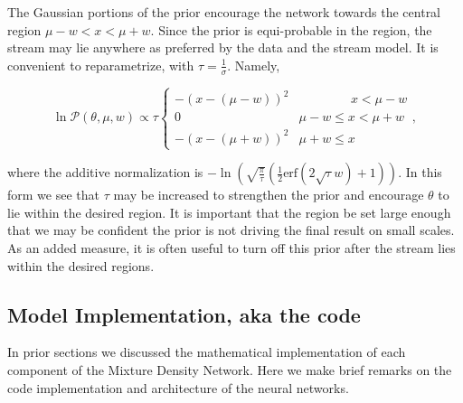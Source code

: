 \documentclass[twocolumn]{aastex631}
\newcommand{\mcal}[1]{\mathcal{#1}}
\newcommand{\pdf}{\mcal{P}}
\begin{document}
            The Gaussian portions of the prior encourage the network towards the central region $\mu - w < x < \mu + w$. Since the prior is equi-probable in the region, the stream may lie anywhere as preferred by the data and the stream model.
            It is convenient to reparametrize, with $\tau = \frac{1}{\sigma}$. Namely,
            \begin{small}
            \begin{equation}
                \ln \pdf(\theta,\mu,w) \propto \tau \begin{cases} 
                    -\left(x-(\mu-w)\right)^2 & \phantom{\mu - w <}\ x < \mu - w \\
                    0 & \mu - w \leq x < \mu + w \\
                    -\left(x-(\mu+w)\right)^2 & \mu + w \leq x
                \end{cases},
            \end{equation}\end{small}
            where the additive normalization is 
            $-\ln\left(\sqrt{\frac{\pi}{\tau}} \left(\frac{1}{2}\text{erf}\left(2 \sqrt{\tau } w\right)+1\right)\right)$. In this form we see that $\tau$ may be increased to strengthen the prior and encourage $\theta$ to lie within
            the desired region. It is important that the region be set large enough that we may be confident the prior is not driving the final result on small scales. As an added measure, it is often useful to turn off this prior after the stream lies within the desired regions.



    \vspace{5pt}
    \subsection{Model Implementation, aka the code} \label{sub:model_implementation}

        In prior sections we discussed the mathematical implementation of each component of the Mixture Density Network. Here we make brief remarks on the code implementation and architecture of the neural networks.
\end{document}
